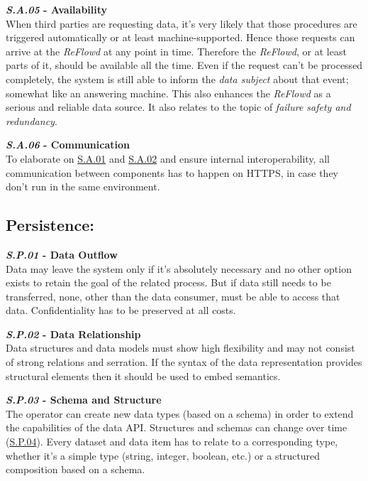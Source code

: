 \documentclass[12pt,english,a4paper,titlepage,cleardoublepage=empty,dottedtoc]{report}
\begin{document}
\textbf{\emph{\protect\hypertarget{sa05}{}{S.A.05}} - Availability}\\
When third parties are requesting data, it's very likely that those
procedures are triggered automatically or at least machine-supported.
Hence those requests can arrive at the \emph{ReFlowd} at any point in
time. Therefore the \emph{ReFlowd}, or at least parts of it, should be
available all the time. Even if the request can't be processed
completely, the system is still able to inform the \emph{data subject}
about that event; somewhat like an answering machine. This also enhances
the \emph{ReFlowd} as a serious and reliable data source. It also
relates to the topic of \emph{failure safety and redundancy}.

\textbf{\emph{\protect\hypertarget{sa06}{}{S.A.06}} - Communication}\\
To elaborate on \protect\hyperlink{sa01}{S.A.01} and
\protect\hyperlink{sa02}{S.A.02} and ensure internal interoperability,
all communication between components has to happen on HTTPS, in case
they don't run in the same environment.

\subsection*{Persistence:}\label{persistence}

\textbf{\emph{\protect\hypertarget{sp01}{}{S.P.01}} - Data Outflow}\\
Data may leave the system only if it's absolutely necessary and no other
option exists to retain the goal of the related process. But if data
still needs to be transferred, none, other than the data consumer, must
be able to access that data. Confidentiality has to be preserved at all
costs.

\textbf{\emph{\protect\hypertarget{sp02}{}{S.P.02}} - Data
Relationship}\\
Data structures and data models must show high flexibility and may not
consist of strong relations and serration. If the syntax of the data
representation provides structural elements then it should be used to
embed semantics.

\textbf{\emph{\protect\hypertarget{sp03}{}{S.P.03}} - Schema and
Structure}\\
The operator can create new data types (based on a schema) in order to
extend the capabilities of the data API. Structures and schemas can
change over time (\protect\hyperlink{sp04}{S.P.04}). Every dataset and
data item has to relate to a corresponding type, whether it's a simple
type (string, integer, boolean, etc.) or a structured composition based
on a schema.
\end{document}
